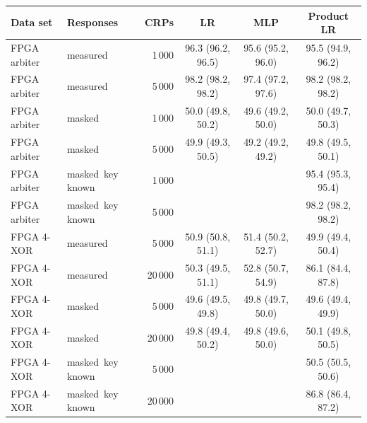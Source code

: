 \begin{tabular}{llrccc}
\toprule
Data set & Responses & CRPs & LR & MLP & Product LR \\
\midrule
FPGA arbiter & measured & 1\,000 & 96.3 (96.2, 96.5) & 95.6 (95.2, 96.0) & 95.5 (94.9, 96.2) \\
FPGA arbiter & measured & 5\,000 & 98.2 (98.2, 98.2) & 97.4 (97.2, 97.6) & 98.2 (98.2, 98.2) \\
FPGA arbiter & masked & 1\,000 & 50.0 (49.8, 50.2) & 49.6 (49.2, 50.0) & 50.0 (49.7, 50.3) \\
FPGA arbiter & masked & 5\,000 & 49.9 (49.3, 50.5) & 49.2 (49.2, 49.2) & 49.8 (49.5, 50.1) \\
FPGA arbiter & masked\, key known & 1\,000 &  &  & 95.4 (95.3, 95.4) \\
FPGA arbiter & masked\, key known & 5\,000 &  &  & 98.2 (98.2, 98.2) \\
\midrule
FPGA 4-XOR & measured & 5\,000 & 50.9 (50.8, 51.1) & 51.4 (50.2, 52.7) & 49.9 (49.4, 50.4) \\
FPGA 4-XOR & measured & 20\,000 & 50.3 (49.5, 51.1) & 52.8 (50.7, 54.9) & 86.1 (84.4, 87.8) \\
FPGA 4-XOR & masked & 5\,000 & 49.6 (49.5, 49.8) & 49.8 (49.7, 50.0) & 49.6 (49.4, 49.9) \\
FPGA 4-XOR & masked & 20\,000 & 49.8 (49.4, 50.2) & 49.8 (49.6, 50.0) & 50.1 (49.8, 50.5) \\
FPGA 4-XOR & masked\, key known & 5\,000 &  &  & 50.5 (50.5, 50.6) \\
FPGA 4-XOR & masked\, key known & 20\,000 &  &  & 86.8 (86.4, 87.2) \\
\bottomrule
\end{tabular}
